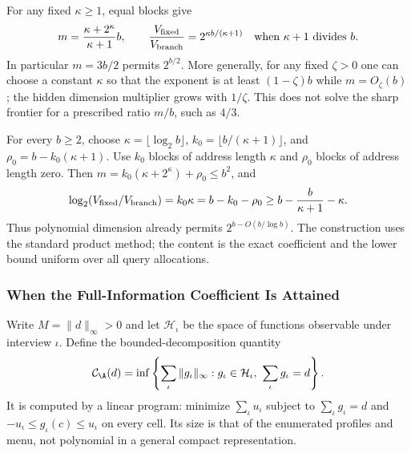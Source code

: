 For any fixed $\kappa\ge1$, equal blocks give
\[
 m=\frac{\kappa+2^\kappa}{\kappa+1}b,\qquad
 \frac{V_{\rm fixed}}{V_{\rm branch}}=2^{\kappa b/(\kappa+1)}
 \quad\text{when }\kappa+1\text{ divides }b.
\]
In particular $m=3b/2$ permits $2^{b/2}$. More generally, for any fixed $\zeta>0$ one can choose a constant $\kappa$ so that the exponent is at least $(1-\zeta)b$ while $m=O_\zeta(b)$; the hidden dimension multiplier grows with $1/\zeta$. This does not solve the sharp frontier for a prescribed ratio $m/b$, such as $4/3$.

For every $b\ge2$, choose $\kappa=\lfloor\log_2 b\rfloor$, $k_0=\lfloor b/(\kappa+1)\rfloor$, and $\rho_0=b-k_0(\kappa+1)$. Use $k_0$ blocks of address length $\kappa$ and $\rho_0$ blocks of address length zero. Then $m=k_0(\kappa+2^\kappa)+\rho_0\le b^2$, and
\[
 \log_2(V_{\rm fixed}/V_{\rm branch})
 =k_0\kappa=b-k_0-\rho_0
 \ge b-\frac{b}{\kappa+1}-\kappa.
\]
Thus polynomial dimension already permits $2^{b-O(b/\log b)}$. The construction uses the standard product method; the content is the exact coefficient and the lower bound uniform over all query allocations.

\subsubsection{When the Full-Information Coefficient Is Attained}\label{app:equality}
Write $M=\|d\|_\infty>0$ and let $\mathcal H_\iota$ be the space of functions observable under interview $\iota$. Define the bounded-decomposition quantity
\[
 \mathcal C_\A(d)=\inf\left\{\sum_\iota\|g_\iota\|_\infty:
       g_\iota\in\mathcal H_\iota,\ \sum_\iota g_\iota=d\right\}.
\]
It is computed by a linear program: minimize $\sum_\iota u_\iota$ subject to $\sum_\iota g_\iota=d$ and $-u_\iota\le g_\iota(c)\le u_\iota$ on every cell. Its size is that of the enumerated profiles and menu, not polynomial in a general compact representation.

